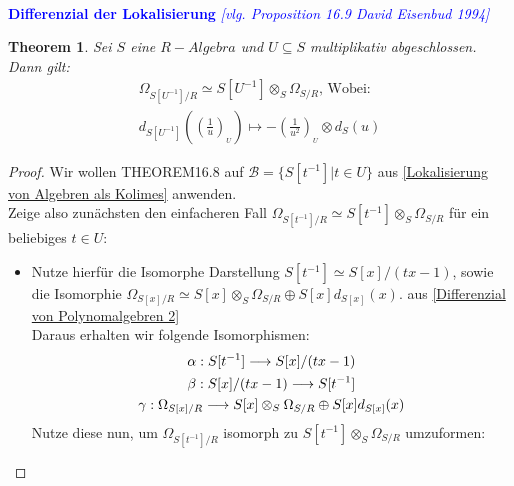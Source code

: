 \documentclass[10pt,a4paper]{report}
\newcommand{\comment}[1]{}
\newcommand{\ModulsOfDifferenzials}{David Eisenbud 1994}
\newcounter{Aussage}[chapter]
\newtheorem{theorem}[Aussage]{Theorem}
\newcommand{\functionfront}[3]{\nolinebreak{#1:#2 \longrightarrow #3}}
\newcommand{\divR}[2]{\Omega_{#1/#2}}
\newcommand{\divf}[1]{d_{#1}}
\newcommand{\Tensor}[3]{#1 \otimes_{#2} #3}
\newcommand{\tensor}[3]{#1 \otimes #3}
\newcommand{\lok}[2]{#1 [#2^{-1}]}
\newcommand{\loke}[3]{(\frac{#1}{#2})_{_{#3}}}
\begin{document}
\ \\
\textcolor{blue}{\textbf{Differenzial der Lokalisierung} \textit{[vlg. Proposition 16.9 \ModulsOfDifferenzials]}}
\begin{theorem}\label{Differenzial der Lokalisierung}
Sei $S$ eine $R-Algebra$ und $U \subseteq S$ multiplikativ abgeschlossen.
Dann gilt:
\begin{gather*}
\divR{\lok{S}{U}}{R} \simeq \Tensor{\lok{S}{U}}{S}{\divR{S}{R}} \text{, Wobei:}\\
 \divf{\lok{S}{U}}(\loke{1}{u}{U}) \longmapsto -\tensor{\loke{1}{u^2}{U}}{S}{\divf{S}(u)}
\end{gather*}
\end{theorem}
\begin{proof}
Wir wollen THEOREM16.8 \comment{\label{THEOREM16.8}} auf $\mathcal{B} = \lbrace \lok{S}{t} \vert t \in U \rbrace$ aus \cref{Lokalisierung von Algebren als Kolimes} anwenden.\\
Zeige also zunächsten den einfacheren Fall $\divR{\lok{S}{t}}{R} \simeq \Tensor{\lok{S}{t}}{S}{\divR{S}{R}}$ für ein beliebiges $t \in U$:
\begin{itemize}
\item[]
Nutze hierfür die Isomorphe Darstellung $\lok{S}{t} \simeq S[x]/(tx -1)$, sowie die Isomorphie $\divR{S[x]}{R} \simeq \Tensor{S[x]}{S}{\divR{S}{R}} \oplus S[x]\divf{S[x]}(x)$. aus \cref{Differenzial von Polynomalgebren 2}\\
Daraus erhalten wir folgende Isomorphismen:
\begin{gather*}
\functionfront{\alpha}{\lok{S}{t}}{S[x]/(tx -1)} \\
\functionfront{\beta}{S[x]/(tx -1)}{\lok{S}{t}} \\
\functionfront{\gamma}{\divR{S[x]}{R}}{ \Tensor{S[x]}{S}{\divR{S}{R}} \oplus S[x]\divf{S[x]}(x) }
\end{gather*}
Nutze diese nun, um $\divR{\lok{S}{t}}{R}$ isomorph zu $\Tensor{\lok{S}{t}}{S}{\divR{S}{R}}$ umzuformen:
\begin{center}
\end{center}
\end{itemize}
\end{proof}
\end{document}
